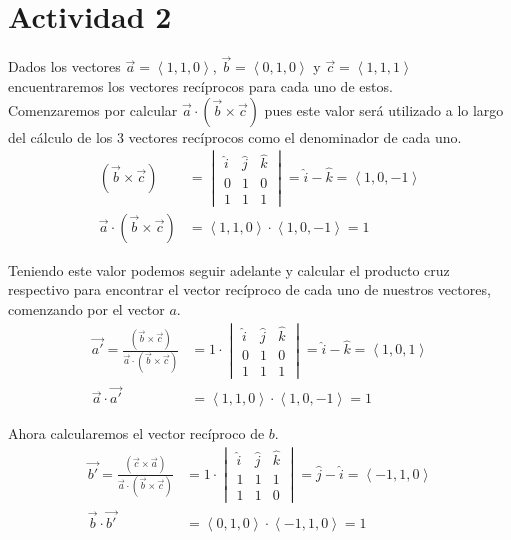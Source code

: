 \documentclass{article}
\newcommand{\custvec}[1]{\left\langle#1\right\rangle}
\begin{document}
\section{Actividad 2}
Dados los vectores $\vec{a}=\custvec{1,1,0}$, $\vec{b}=\custvec{0,1,0}$ y $\vec{c}=\custvec{1,1,1}$ encuentraremos los vectores recíprocos para cada uno de estos.\\

Comenzaremos por calcular $\vec{a}\cdot (\vec{b}\times \vec{c})$ pues este valor será utilizado a lo largo del cálculo de los 3 vectores recíprocos como el denominador de cada uno.\\
\begin{equation*}
    \begin{split}
        (\vec{b}\times \vec{c}) &= \begin{vmatrix}
        \hat{i} & \hat{j} & \hat{k} \\
        0 & 1 & 0 \\
        1 & 1 & 1
        \end{vmatrix} = \hat{i} - \hat{k} = \custvec{1,0,-1}\\
        \vec{a}\cdot (\vec{b}\times \vec{c}) &= \custvec{1,1,0} \cdot \custvec{1,0,-1} = 1
    \end{split}
\end{equation*}

Teniendo este valor podemos seguir adelante y calcular el producto cruz respectivo para encontrar el vector recíproco de cada uno de nuestros vectores, comenzando por el vector $a$.\\
\begin{equation*}
    \begin{split}
        \vec{a'} = \frac{(\vec{b}\times \vec{c})}{\vec{a}\cdot (\vec{b}\times \vec{c})} &= 1\cdot \begin{vmatrix}
        \hat{i} & \hat{j} & \hat{k} \\
        0 & 1 & 0 \\
        1 & 1 & 1
        \end{vmatrix} = \hat{i} - \hat{k} = \custvec{1,0,1}\\
        \vec{a}\cdot \vec{a'} &= \custvec{1,1,0}\cdot \custvec{1,0,-1} = 1 
    \end{split}
\end{equation*}

Ahora calcularemos el vector recíproco de $b$.
\begin{equation*}
    \begin{split}
        \vec{b'} = \frac{(\vec{c}\times \vec{a})}{\vec{a}\cdot (\vec{b}\times \vec{c})} &= 1\cdot \begin{vmatrix}
        \hat{i} & \hat{j} & \hat{k} \\
        1 & 1 & 1 \\
        1 & 1 & 0
        \end{vmatrix} = \hat{j} - \hat{i} = \custvec{-1,1,0}\\
        \vec{b}\cdot \vec{b'} &= \custvec{0,1,0}\cdot \custvec{-1,1,0} = 1 
    \end{split}
\end{equation*}
\end{document}
